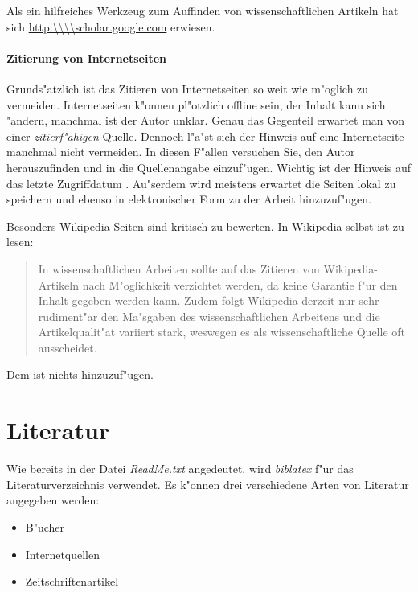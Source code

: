 Als ein hilfreiches Werkzeug zum Auffinden von wissenschaftlichen Artikeln hat sich \url{http:\\\\scholar.google.com} erwiesen.

\paragraph{Zitierung von Internetseiten}
Grunds"atzlich ist das Zitieren von Internetseiten so weit wie m"oglich zu vermeiden.
Internetseiten k"onnen pl"otzlich offline sein, der Inhalt kann sich "andern, manchmal ist der Autor unklar.
Genau das Gegenteil erwartet man von einer \emph{zitierf"ahigen} Quelle.
Dennoch l"a"st sich der Hinweis auf eine Internetseite manchmal nicht vermeiden.
In diesen F"allen versuchen Sie, den Autor herauszufinden und in die Quellenangabe einzuf"ugen.
Wichtig ist der Hinweis auf das letzte Zugriffdatum \cite{zitieren13}.
Au"serdem wird meistens erwartet die Seiten lokal zu speichern und ebenso in elektronischer Form zu der Arbeit hinzuzuf"ugen.

Besonders Wikipedia-Seiten sind kritisch zu bewerten. In Wikipedia selbst ist zu lesen:
\begin{quote}
\glqq In wissenschaftlichen Arbeiten sollte auf das Zitieren von Wikipedia-Artikeln nach M"oglichkeit verzichtet werden, da keine Garantie f"ur den Inhalt gegeben werden kann.
Zudem folgt Wikipedia derzeit nur sehr rudiment"ar den Ma"sgaben des wissenschaftlichen Arbeitens und die Artikelqualit"at variiert stark, weswegen es als wissenschaftliche Quelle oft ausscheidet.\grqq \cite{zitieren13a}
\end{quote}
Dem ist nichts hinzuzuf"ugen.

\section{Literatur}
\label{sec:Literatur}

Wie bereits in der Datei \textit{ReadMe.txt} angedeutet, wird \textit{biblatex} f"ur das Literaturverzeichnis verwendet. Es k"onnen drei verschiedene Arten von Literatur angegeben werden:

\begin{itemize}
\item B"ucher\cite{wissentschaftlichesArbeitMitLatex}
\item Internetquellen\cite{zitieren13a}
\item Zeitschriftenartikel
\end{itemize}

